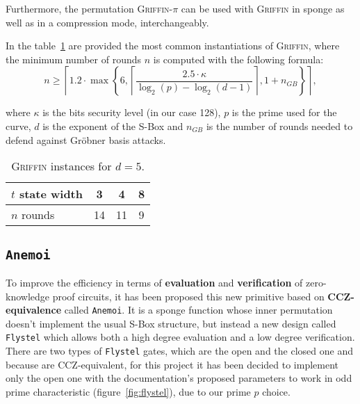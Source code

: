 \documentclass[12pt, a4paper]{report}
\begin{document}
Furthermore, the permutation \textsc{Griffin-$\pi$} can be used with \textsc{Griffin} in sponge as well as in a compression mode, interchangeably. 

In the table~\ref{tab:griffininstances} are provided the most common instantiations of \textsc{Griffin}, where the minimum number of rounds $n$ is computed with the following formula:
\begin{equation}
  n \ge \left\lceil 1.2 \cdot \max \left\{6, \left\lceil \frac{2.5 \cdot \kappa}{\log_2(p) - \log_2(d-1)} \right\rceil, 1 + n_{GB} \right\} \right\rceil,
  \label{eq:griffinrounds}
\end{equation}

where $\kappa$ is the bits security level (in our case 128), $p$ is the prime used for the curve, $d$ is the exponent of the S-Box and $n_{GB}$ is the number of rounds needed to defend against Gr\"obner basis attacks.

\begin{table}[H]
  \caption{\textsc{Griffin} instances for $d = 5$.}\label{tab:griffininstances}
  \begin{center}
    \begin{tabular}{|l|c|c|c|}
      \hline
      $t$ state width & 3 & 4 & 8 \\
      \hline
      $n$ rounds & 14 & 11 & 9 \\
      \hline
    \end{tabular}
  \end{center}
\end{table}

\subsection{\texttt{Anemoi}}\label{subsec:anemoi}

To improve the efficiency in terms of \textbf{evaluation} and \textbf{verification} of zero-knowledge proof circuits, it has been proposed this new primitive based on \textbf{CCZ-equivalence} called \texttt{Anemoi}. It is a sponge function whose inner permutation doesn't implement the usual S-Box structure, but instead a new design called \texttt{Flystel} which allows both a high degree evaluation and a low degree verification.
There are two types of \texttt{Flystel} gates, which are the open and the closed one and because are CCZ-equivalent, for this project it has been decided to implement only the open one with the documentation's proposed parameters to work in odd prime characteristic (figure~\ref{fig:flystel}), due to our prime $p$ choice.
\end{document}
